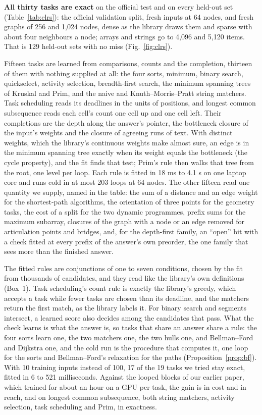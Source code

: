 \documentclass[10pt]{article}
\begin{document}
\textbf{All thirty tasks are exact} on the official test and on every held-out set (Table~\ref{tab:clrs}): the official
validation split, fresh inputs at 64 nodes, and fresh graphs of 256 and 1,024 nodes, dense as the library
draws them and sparse with about four neighbours a node; arrays and strings go to 4,096 and
5,120 items. That is 129 held-out sets with no miss (Fig.~\ref{fig:clrs}).

Fifteen tasks are learned from comparisons, counts and the completion, thirteen of them with nothing
supplied at all: the four sorts, minimum, binary search, quickselect, activity selection, breadth-first search, the
minimum spanning trees of Kruskal and Prim, and the naive and Knuth--Morris--Pratt string matchers. Task scheduling reads
its deadlines in the units of positions, and longest common subsequence reads each cell's count one cell up and one cell
left. Their completions are the depth along the answer's pointer, the bottleneck closure of the input's weights and the
closure of agreeing runs of text. With distinct weights, which the library's continuous weights make almost sure, an edge
is in the minimum spanning tree exactly when its weight equals the bottleneck (the cycle property), and the fit finds that
test; Prim's rule then walks that tree from the root, one level per loop. Each rule is fitted in 18 ms to
4.1 s on one laptop core and runs cold in at most 203 loops at 64 nodes. The other fifteen
read one quantity we supply, named in the table: the sum of a distance and an edge weight for the shortest-path
algorithms, the orientation of three points for the geometry tasks, the cost of a split for the two dynamic programmes,
prefix sums for the maximum subarray, closures of the graph with a node or an edge removed for articulation points and
bridges, and, for the depth-first family, an ``open'' bit with a check fitted at every prefix of the answer's own
preorder, the one family that sees more than the finished answer.

The fitted rules are conjunctions of one to seven conditions, chosen by the fit from thousands of candidates, and they
read like the library's own definitions (Box~1). Task scheduling's count rule is exactly the library's greedy, which
accepts a task while fewer tasks are chosen than its deadline, and the matchers return the first match, as the library
labels it. For binary search and segments intersect, a learned score also decides among the candidates that pass. What
the check learns is what the answer is, so tasks that share an answer share a rule: the four sorts learn one, the two
matchers one, the two hulls one, and Bellman--Ford and Dijkstra one, and the cold run is the procedure that
computes it, one loop for the sorts and Bellman--Ford's relaxation for the paths (Proposition~\ref{prop:bf}). With 10
training inputs instead of 100, 17 of the 19 tasks we tried stay exact, fitted in
6 to 521 milliseconds. Against the looped blocks of our earlier paper, which trained for about
an hour on a GPU per task\cite{mohsenvand2026zero}, the gain is in cost and in reach, and on longest common subsequence,
both string matchers, activity selection, task scheduling and Prim, in exactness.
\end{document}
